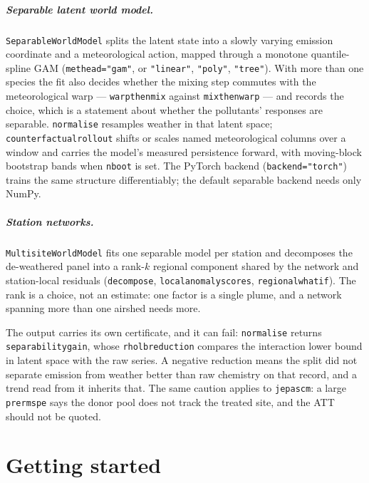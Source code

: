 \documentclass[11pt]{report}
\newcommand{\codeunderscore}{\textunderscore\allowbreak}
\newcommand{\code}[1]{\texttt{\let\_\codeunderscore #1}}
\begin{document}
\paragraph{Separable latent world model.} \code{SeparableWorldModel} splits the
latent state into a slowly varying emission coordinate and a meteorological
action, mapped through a monotone quantile-spline GAM (\code{met\_head="gam"},
or \code{"linear"}, \code{"poly"}, \code{"tree"}). With more than one species
the fit also decides whether the mixing step commutes with the meteorological
warp --- \code{warp\_then\_mix} against \code{mix\_then\_warp} --- and records
the choice, which is a statement about whether the pollutants' responses are
separable. \code{normalise} resamples weather in that latent space;
\code{counterfactual\_rollout} shifts or scales named meteorological columns
over a window and carries the model's measured persistence forward, with
moving-block bootstrap bands when \code{n\_boot} is set. The PyTorch backend
(\code{backend="torch"}) trains the same structure differentiably; the default
separable backend needs only NumPy.

\paragraph{Station networks.} \code{MultisiteWorldModel} fits one separable
model per station and decomposes the de-weathered panel into a rank-$k$
regional component shared by the network and station-local residuals
(\code{decompose}, \code{local\_anomaly\_scores}, \code{regional\_what\_if}).
The rank is a choice, not an estimate: one factor is a single plume, and a
network spanning more than one airshed needs more.

The output carries its own certificate, and it can fail: \code{normalise}
returns \code{separability\_gain}, whose \code{rho\_lb\_reduction} compares the
interaction lower bound in latent space with the raw series. A negative
reduction means the split did not separate emission from weather better than
raw chemistry on that record, and a trend read from it inherits that. The same
caution applies to \code{jepa\_scm}: a large \code{pre\_rmspe} says the donor
pool does not track the treated site, and the ATT should not be quoted.

\chapter{Getting started}\label{ch:start}
\end{document}
